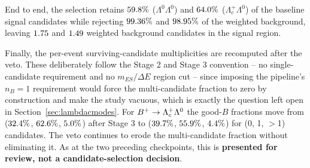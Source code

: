 End to end, the selection retains $59.8\%$
($\Lambda^0\Lambda^0$) and $64.0\%$
($\Lambda_c^+\Lambda^0$) of the baseline signal candidates while rejecting
$99.36\%$ and $98.95\%$ of the
weighted background, leaving $1.75$ and
$1.49$ weighted background candidates in the signal
region.

Finally, the per-event surviving-candidate multiplicities are recomputed
after the veto. These deliberately follow the Stage 2 and Stage 3
convention -- no single-candidate requirement and no $m_{ES}/\Delta E$
region cut -- since imposing the pipeline's $n_B = 1$ requirement would
force the multi-candidate fraction to zero by construction and make the
study vacuous, which is exactly the question left open in
Section~\ref{sec:lambdacmodes}. For $B^+ \rightarrow \Lambda_c^+\Lambda^0$
the good-$B$ fractions move from ($32.4\%$,
$62.6\%$, $5.0\%$) after
Stage 3 to ($39.7\%$,
$55.9\%$, $4.4\%$) for
(0, 1, $>$1) candidates. The veto continues to erode the multi-candidate
fraction without eliminating it. As at the two preceding checkpoints, this
is \textbf{presented for review, not a candidate-selection decision}.
